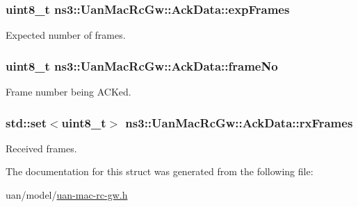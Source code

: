 \subsubsection[{\texorpdfstring{exp\+Frames}{expFrames}}]{\setlength{\rightskip}{0pt plus 5cm}uint8\+\_\+t ns3\+::\+Uan\+Mac\+Rc\+Gw\+::\+Ack\+Data\+::exp\+Frames}\hypertarget{structns3_1_1UanMacRcGw_1_1AckData_a28f52eb334f27e743967a3f63b7926cf}{}\label{structns3_1_1UanMacRcGw_1_1AckData_a28f52eb334f27e743967a3f63b7926cf}


Expected number of frames. 

\subsubsection[{\texorpdfstring{frame\+No}{frameNo}}]{\setlength{\rightskip}{0pt plus 5cm}uint8\+\_\+t ns3\+::\+Uan\+Mac\+Rc\+Gw\+::\+Ack\+Data\+::frame\+No}\hypertarget{structns3_1_1UanMacRcGw_1_1AckData_a4bba84663753920fd4dd55a84838c156}{}\label{structns3_1_1UanMacRcGw_1_1AckData_a4bba84663753920fd4dd55a84838c156}


Frame number being A\+CK\textquotesingle{}ed. 

\subsubsection[{\texorpdfstring{rx\+Frames}{rxFrames}}]{\setlength{\rightskip}{0pt plus 5cm}std\+::set$<$uint8\+\_\+t$>$ ns3\+::\+Uan\+Mac\+Rc\+Gw\+::\+Ack\+Data\+::rx\+Frames}\hypertarget{structns3_1_1UanMacRcGw_1_1AckData_a74b12135a7e92a7e229e455535ddf16b}{}\label{structns3_1_1UanMacRcGw_1_1AckData_a74b12135a7e92a7e229e455535ddf16b}


Received frames. 



The documentation for this struct was generated from the following file\+:\begin{DoxyCompactItemize}
\item 
uan/model/\hyperlink{uan-mac-rc-gw_8h}{uan-\/mac-\/rc-\/gw.\+h}\end{DoxyCompactItemize}
